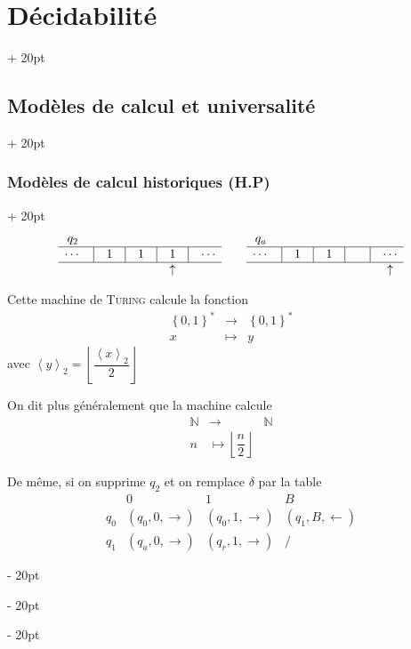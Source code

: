 \documentclass[a4paper, 12pt, twoside]{article}
\newcommand{\N}{\mathbb{N}} %
\newcommand{\set}[1]{\left\{ #1 \right\}}
\newcommand{\floor}[1]{\left\lfloor #1 \right\rfloor}
\newcommand{\lrangle}[1]{\left\langle #1 \right\rangle}
\newcommand{\ind}[1][20pt]{\advance\leftskip + #1}
\newcommand{\deind}[1][20pt]{\advance\leftskip - #1}
\newenvironment{indt}[2][20pt]{#2 \par \ind[#1]}{\par \deind} %
\begin{document}
\begin{indt}{\section{Décidabilité}}
\begin{indt}{\subsection{Modèles de calcul et universalité}}
\begin{indt}{\subsubsection{Modèles de calcul historiques (H.P)}}
\[\begin{array}{ccc}
                        \begin{array}{ccccccccc}
                            q_2
                            \\
                            \hline
                            \cdots
                            & \vline & 1 & \vline & 1 & \vline & 1 & \vline & \cdots
                            \\
                            \hline
                            &&&&&& \uparrow
                        \end{array}
                        &
                        &
                        \begin{array}{ccccccccc}
                            q_a
                            \\
                            \hline
                            \cdots
                            & \vline & 1 & \vline & 1 & \vline &  & \vline & \cdots
                            \\
                            \hline
                            &&&&&&&& \uparrow
                        \end{array}
                    \end{array}
                \]

                 Cette machine de \textsc{Turing} calcule la fonction
                 \[
                     \begin{array}{ccc}
                         \set{0, 1}^* & \longrightarrow & \set{0, 1}^*
                         \\
                         x & \longmapsto & y
                     \end{array}
                 \]
                 avec $\lrangle y _2 = \floor{\dfrac{\lrangle x _2} 2}$

                 On dit plus généralement que la machine calcule
                 \[
                     \begin{array}{ccc}
                         \N & \longrightarrow & \N
                         \\
                         n & \longmapsto \floor{\dfrac n 2}
                     \end{array}
                 \]

                 De même, si on supprime $q_2$ et on remplace $\delta$ par la table
                 \[
                     \begin{array}{c|ccc}
                         & 0 & 1 & B
                         \\
                         \hline
                         q_0 & (q_0, 0, \rightarrow) & (q_0, 1, \rightarrow) & (q_1, B, \leftarrow)
                         \\
                         q_1 & (q_a, 0, \rightarrow) & (q_r, 1, \rightarrow) & /
                     \end{array}
                 \]


\end{indt}
\end{indt}
\end{indt}
\end{document}
